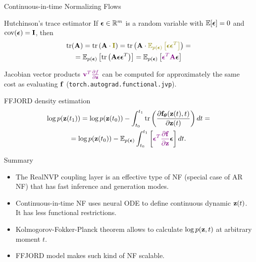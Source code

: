 \begin{frame}{Continuous-in-time Normalizing Flows}
	\begin{block}{Hutchinson's trace estimator}
		If $\boldsymbol{\epsilon} \in \mathbb{R}^m$ is a random variable with $\mathbb{E} [\boldsymbol{\epsilon}] = 0$ and $\text{cov} (\boldsymbol{\epsilon}) = \mathbf{I}$, then
		\vspace{-0.3cm}
		\begin{multline*}
		    \text{tr}(\mathbf{A}) = \text{tr}\left(\mathbf{A} \cdot {\color{olive}\bI} \right) = \text{tr}\left(\mathbf{A} \cdot {\color{olive}\mathbb{E}_{p(\bepsilon)} \left[ \bepsilon \bepsilon^T \right]} \right) = \\ 
		    =  \mathbb{E}_{p(\bepsilon)} \left[  \text{tr}\left(  \mathbf{A}  \bepsilon \bepsilon^T \right) \right] =  \mathbb{E}_{p(\bepsilon)} \left[ {\color{violet} \bepsilon^T \mathbf{A}} \bepsilon  \right]
		\end{multline*}
		\vspace{-0.6 cm}
	\end{block}
	Jacobian vector products ${\color{violet}\mathbf{v}^T \frac{\partial f}{\partial \mathbf{z}}}$ can be computed for approximately the same cost as evaluating $\mathbf{f}$ (\texttt{torch.autograd.functional.jvp}).
	\begin{block}{FFJORD density estimation}
		\vspace{-0.8cm}
		\begin{multline*}
		    \log p(\mathbf{z}(t_1)) = \log p(\mathbf{z}(t_0)) - \int_{t_0}^{t_1} \text{tr}  \left( \frac{\partial \mathbf{f}_{\boldsymbol{\theta}}(\mathbf{z}(t), t)}{\partial \mathbf{z}(t)} \right) dt = \\ = \log p(\mathbf{z}(t_0)) - \mathbb{E}_{p(\boldsymbol{\epsilon})} \int_{t_0}^{t_1} \left[ {\color{violet}\boldsymbol{\epsilon}^T \frac{\partial \mathbf{f}}{\partial \mathbf{z}}} \boldsymbol{\epsilon} \right] dt.
		\end{multline*}
	\end{block}
\end{frame}
\begin{frame}{Summary}
	\begin{itemize}
		\item The RealNVP coupling layer is an effective type of NF (special case of AR NF) that has fast inference and generation modes.
		\vfill
		\item Continuous-in-time NF uses neural ODE to define continuous dynamic $\mathbf{z}(t)$. It has less functional restrictions.
		\vfill 
		\item Kolmogorov-Fokker-Planck theorem allows to calculate $\log p(\mathbf{z}, t)$ at arbitrary moment $t$.
		\vfill
		\item FFJORD model makes such kind of NF scalable.
	\end{itemize}
\end{frame}
 